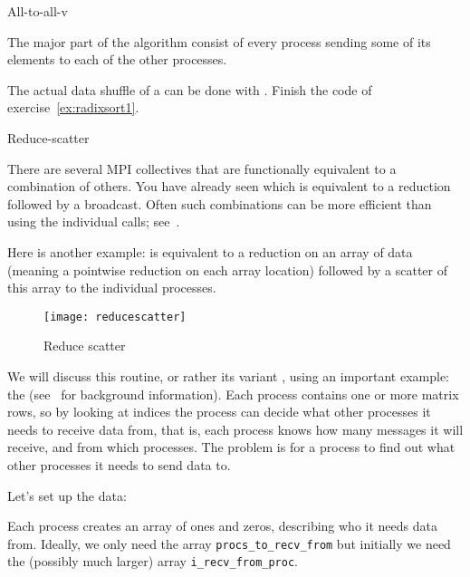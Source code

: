 
 {All-to-all-v}

The major part of the  algorithm consist
of every process sending some of its elements to
each of the other processes.

\begin{exercise}
  \label{ex:radixsort2}
  The actual data shuffle of a  can be done
  with . Finish the code of
  exercise~\ref{ex:radixsort1}.
\end{exercise}

 {Reduce-scatter}
\label{sec:reducescatter}

There are several MPI collectives that are functionally equivalent to
a combination of others. You have already seen  which
is equivalent to a reduction followed by a broadcast. Often such
combinations can be more efficient than using the individual calls;
see~.

Here is another example:  is equivalent
to a reduction on an array of data (meaning a pointwise reduction on each
array location) followed by a scatter of this array to the individual 
processes.

\begin{figure}[ht]
  \texttt{[image: reducescatter]}
  \caption{Reduce scatter}
  \label{fig:reducescatter}
\end{figure}

We will discuss this routine,
or rather its variant ,
using an important example: the
(see~ for background information).
Each process contains one or more matrix rows, so by looking at indices
the process can decide what other processes it needs
to receive data from,
that is, each process knows how many messages it will receive,
and from which processes.
The problem is for a process to find out what other processes 
it needs to send data to.

Let's set up the data:
%

Each process creates an array of ones and zeros, describing who
it needs data from.
Ideally, we only need the array \lstinline+procs_to_recv_from+
but initially we need the (possibly much larger) array
\lstinline+i_recv_from_proc+.

